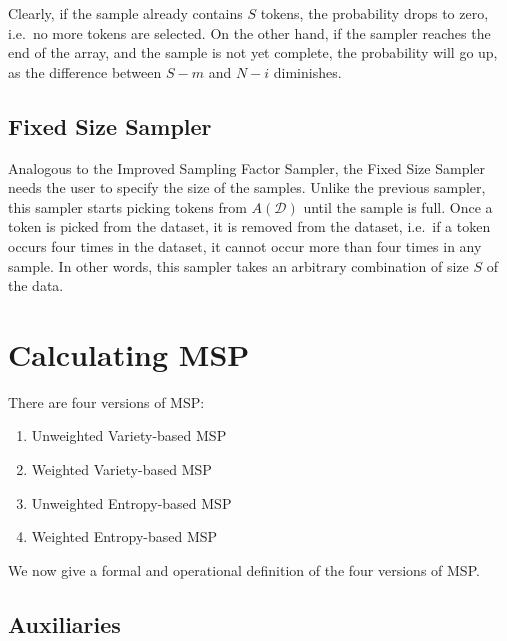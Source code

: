 \documentclass{article}
\begin{document}
Clearly, if the sample already contains $S$ tokens, the probability drops to zero, i.e.\ no more tokens are selected. On the other hand, if the sampler reaches the end of the array, and the sample is not yet complete, the probability will go up, as the difference between $S-m$ and $N-i$ diminishes.


\subsection{Fixed Size Sampler}

Analogous to the Improved Sampling Factor Sampler, the Fixed Size Sampler needs the user to specify the size of the samples. Unlike the previous sampler, this sampler starts picking tokens from $A(\mathcal{D})$ until the sample is full. Once a token is picked from the dataset, it is removed from the dataset, i.e.\ if a token occurs four times in the dataset, it cannot occur more than four times in any sample. In other words, this sampler takes an arbitrary combination of size $S$ of the data. 




\section{Calculating MSP}

There are four versions of MSP:
\begin{enumerate}
\item Unweighted Variety-based MSP
\item Weighted Variety-based MSP
\item Unweighted Entropy-based MSP
\item Weighted Entropy-based MSP
\end{enumerate}

We now give a formal and operational definition of the four versions of MSP.


\subsection{Auxiliaries}
\end{document}
